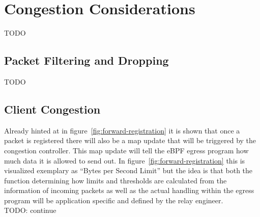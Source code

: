 \section{Congestion Considerations}\label{sec:congestion_considerations}
TODO

\subsection{Packet Filtering and Dropping}
TODO

\subsection{Client Congestion}
Already hinted at in figure~\ref{fig:forward-registration} it is shown that once a packet is 
registered there will also be a map update that will be triggered by the congestion controller.
This map update will tell the eBPF egress program how much data it is allowed to send out. 
In figure~\ref{fig:forward-registration} this is visualized exemplary as ``Bytes per Second Limit''
but the idea is that both the function determining how limits and thresholds are calculated from 
the information of incoming packets as well as the actual handling within the egress program 
will be application specific and defined by the relay engineer.
\\
TODO: continue